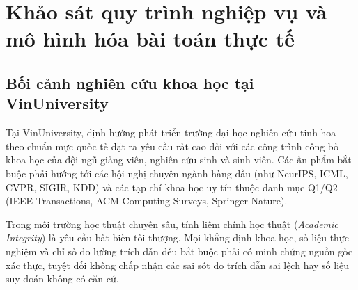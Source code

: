 \section{Khảo sát quy trình nghiệp vụ và mô hình hóa bài toán thực tế}
\label{sec:khao_sat}

\subsection{Bối cảnh nghiên cứu khoa học tại VinUniversity}
\label{subsec:boi_canh_vinuni}
Tại VinUniversity, định hướng phát triển trường đại học nghiên cứu tinh hoa theo chuẩn mực quốc tế đặt ra yêu cầu rất cao đối với các công trình công bố khoa học của đội ngũ giảng viên, nghiên cứu sinh và sinh viên. Các ấn phẩm bắt buộc phải hướng tới các hội nghị chuyên ngành hàng đầu (như NeurIPS, ICML, CVPR, SIGIR, KDD) và các tạp chí khoa học uy tín thuộc danh mục Q1/Q2 (IEEE Transactions, ACM Computing Surveys, Springer Nature).

Trong môi trường học thuật chuyên sâu, tính liêm chính học thuật (\textit{Academic Integrity}) là yêu cầu bất biến tối thượng. Mọi khẳng định khoa học, số liệu thực nghiệm và chỉ số đo lường trích dẫn đều bắt buộc phải có minh chứng nguồn gốc xác thực, tuyệt đối không chấp nhận các sai sót do trích dẫn sai lệch hay số liệu suy đoán không có căn cứ.

